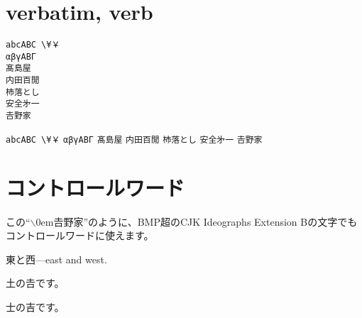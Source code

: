 \documentclass{ujarticle}
\begin{document}
\section{verbatim, verb}
\begin{verbatim}
abcABC \¥￥
αβγΑΒΓ
髙島屋
内田百閒
杮落とし
安全﻿㐧一
𠮷野家
\end{verbatim}

\verb+abcABC \¥￥+
\verb-αβγΑΒΓ-
\verb!髙島屋!
\verb/内田百閒/
\verb#杮落とし#
\verb|安全﻿㐧一|
\verb=𠮷野家=

\edef\bs{$\backslash$\kern0em}
\section{コントロールワード}
\def\𠮷野家{この``\bs 𠮷野家''のように、BMP超のCJK Ideographs Extension Bの文字でもコントロールワードに使えます。}
\𠮷野家

\newcommand\東西{東と西---east and west.}
\東西

\newif\if土の𠮷
\土の𠮷true
\def\test土の𠮷{%
\if土の𠮷
 土の𠮷です。
\else
 士の吉です。
\fi}
\土の𠮷true\test土の𠮷\quad\土の𠮷false\test土の𠮷


\end{document}
